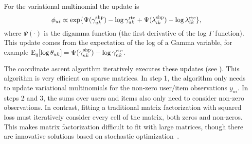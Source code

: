 For the variational multinomial the update is
\begin{equation}
  \phi_{ui} \propto \exp\{\Psi(\gamma_{uk}^{\textrm{shp}}) - \log
  \gamma_{uk}^{\textrm{rte}} + \Psi(\lambda_{ik}^{\textrm{shp}}) - \log
  \lambda_{ik}^{\textrm{rte}}\},
\end{equation}
where $\Psi(\cdot)$ is the digamma function (the first derivative of
the log $\Gamma$ function).  This update comes from the expectation of
the log of a Gamma variable, for example $\textrm{E}_q[\log \theta_{uk}] =
\Psi(\gamma_{nk}^{\textrm{shp}}) - \log \gamma_{nk}^{\textrm{rte}}$.

The coordinate ascent algorithm iteratively executes these updates
(see ).  This algorithm is very efficient on sparse
matrices. In step 1, the algorithm only needs to update variational
multinomials for the non-zero user/item observations $y_{ui}$.  In
steps 2 and 3, the sums over users and items also only need to
consider non-zero observations.  In contrast, fitting a traditional
matrix factorization with squared loss must iteratively consider every
cell of the matrix, both zeros and non-zeros. This makes matrix
factorization difficult to fit with large matrices, though there are
innovative solutions based on stochastic
optimization~\cite{Mairal:2010}.

